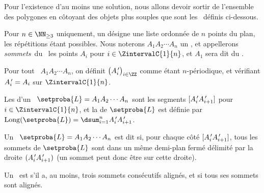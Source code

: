 Pour l'existence d'au moins une solution, nous allons devoir sortir de l'ensemble des polygones en côtoyant des objets plus souples que sont les \ncycles\ définis ci-dessous.




\begin{defi}
	Pour $n \in \NN_{\geq3}$ uniquement, un \focus{\ncycle} désigne une liste ordonnée de $n$ points du plan, les répétitions étant possibles.
	Nous noterons $A_1 A_2 \cdots A_n$ un \ncycle, 
	et appellerons 
	\og \emph{sommets}\fg\ du \ncycle\ les points $A_i$ pour $i \in \ZintervalC{1}{n}$,
	et $A_1$ sera dit  du \ncycle.
\end{defi}


\begin{defi}
    Pour tout \ncycle\ $A_1 A_2 \cdots A_n$, on définit $\big( \primeit{A}_i \big)_{i \in \ZZ}$ comme étant $n$-périodique, et vérifiant $A^{\,\prime}_{i} = A_i$ sur $\ZintervalC{1}{n}$.
\end{defi}


\begin{defi}
	Les  d'un \ncycle\ $\setproba{L} = A_1 A_2 \cdots A_n$ sont les segments
	$[A^{\,\prime}_i A^{\,\prime}_{i+1}]$ pour $i \in \ZintervalC{1}{n}$,
	et
	la  de $\setproba{L}$ est définie par $\cyclelen{\setproba{L}} = \dsum_{i=1}^{n} \primeit{A}_i \primeit{A}_{i+1}$.
\end{defi}


\begin{defi}
	Un \ncycle\ $\setproba{L} = A_1 A_2 \cdots A_n$ est dit  si, pour chaque côté $[A^{\,\prime}_i A^{\,\prime}_{i+1}]$, tous les sommets de $\setproba{L}$ sont dans un même demi-plan fermé délimité par la droite $(A^{\,\prime}_i A^{\,\prime}_{i+1})$ (un sommet peut donc être sur cette droite).
\end{defi}


\begin{defi}
	Un \ncycle\ est  s'il a, au moins, trois sommets consécutifs alignés,
	et
	 si tous ses sommets sont alignés.
\end{defi}


